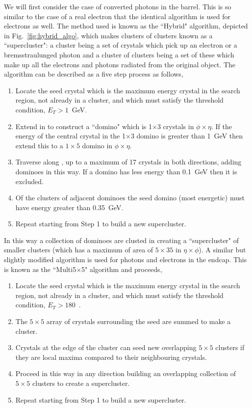 We will first consider the case of converted photons in the barrel. This is so similar to the case of a real electron that the identical algorithm is used for electrons as well. The method used is known as the ``Hybrid" algorithm, depicted in Fig.~\ref{fig:hybrid_algo}, which makes clusters of clusters known as a ``supercluster": a cluster being a set of crystals which pick up an electron or a bremsstraulunged photon and a cluster of clusters being a set of these which make up all the electrons and photons radiated from the original object. The algorithm can be described as a five step process as follows,

\begin{enumerate}
  \item{Locate the seed crystal which is the maximum energy crystal in the search region, not already in a cluster, and which must satisfy the threshold condition, $E_{T}>1$~GeV.}
  \item{Extend in \eta to construct a ``domino" which is 1$\times$3 crystals in $\phi\times\eta$. If the energy of the central crystal in the 1$\times$3 domino is greater than 1~GeV then extend this to a $1\times5$ domino in $\phi\times\eta$.}
  \item{Traverse along \phi, up to a maximum of 17 crystals in both directions, adding dominoes in this way. If a domino has less energy than 0.1~GeV then it is excluded.}
  \item{Of the clusters of adjacent dominoes the seed domino (most energetic) must have energy greater than 0.35~GeV.}
  \item{Repeat starting from Step 1 to build a new supercluster.}
\end{enumerate}

In this way a collection of dominoes are clusted in \phi creating a ``supercluster" of smaller clusters (which has a maximum of area of $5\times35$ in $\eta\times\phi$). A similar but slightly modified algorithm is used for photons and electrons in the endcap. This is known as the ``Multi5$\times$5" algorithm and proceeds,

\begin{enumerate}
  \item{Locate the seed crystal which is the maximum energy crystal in the search region, not already in a cluster, and which must satisfy the threshold condition, $E_{T}>180$~\MeV.}
  \item{The $5\times5$ array of crystals surrounding the seed are summed to make a cluster.}
  \item{Crystals at the edge of the cluster can seed new overlapping $5\times5$ clusters if they are local maxima compared to their neighbouring crystals.}
  \item{Proceed in this way in any direction building an overlapping collection of $5\times5$ clusters to create a supercluster.}
  \item{Repeat starting from Step 1 to build a new supercluster.}
\end{enumerate}

